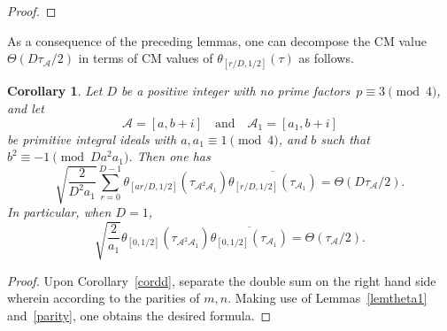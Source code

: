 \documentclass[11pt, reqno]{amsart}
\theoremstyle{plain}
\newtheorem{corollary}[theorem]{Corollary}
\newtheorem{lemma}[theorem]{Lemma}
\theoremstyle{definition}
\numberwithin{equation}{section}
\begin{document}
\begin{proof}
   
\end{proof}




As a consequence of  the preceding lemmas, one can decompose the CM value $\Theta(D\tau_{\mathcal{A}}/2)$ in terms of CM values of $\theta_{[r/D,1/2]}(\tau)$ as follows.


\begin{corollary}\label{cortheta}
    Let $D$ be a positive integer with no prime factors~$p\equiv3\pmod{4}$, and let 
    $$
    \mathcal{A}=[a,b+i]\quad\mbox{and}\quad \mathcal{A}_{1}=[a_{1},b+i]
    $$
    be primitive integral ideals with $a,a_{1}\equiv1\pmod{4}$, and $b$  such that $b^{2}\equiv-1\pmod{Da^{2}a_{1}}$. Then one has 
    $$
     \sqrt{\frac{2}{D^{2}a_{1}}}\sum_{r=0}^{D-1}\theta_{[ar/D,1/2]}(\tau_{\mathcal{A}^{2}\mathcal{A}_{1}})\overline{\theta_{[r/D,1/2]}(\tau_{\mathcal{A}_{1}})}=\Theta(D\tau_{\mathcal{A}}/2).
    $$
    In particular, when $D=1$, 
    $$
    \sqrt{\frac{2}{a_{1}}}\theta_{[0,1/2]}(\tau_{\mathcal{A}^{2}\mathcal{A}_{1}})\overline{\theta_{[0,1/2]}(\tau_{\mathcal{A}_{1}})}=\Theta(\tau_{\mathcal{A}}/2).
    $$
\end{corollary}

\begin{proof}
    Upon Corollary~\ref{cordd}, separate the double sum on the right hand side wherein according to the parities of $m,n$. Making use of Lemmas~\ref{lemtheta1} and~\ref{parity}, one obtains the desired formula.
\end{proof}


\end{document}
